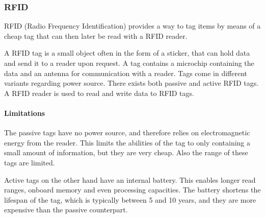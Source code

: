 \subsubsection{RFID}
RFID (Radio Frequency Identification) provides a way to tag items by means of a cheap tag that can then later be read with a RFID reader.

A RFID tag is a small object often in the form of a sticker, that can hold data and send it to a reader upon request.
A tag contains a microchip containing the data and an antenna for communication with a reader.
Tags come in different variants regarding power source.
There exists both passive and active RFID tags.\cite{rfidreview}
A RFID reader is used to read and write data to RFID tags.

\paragraph{Limitations}
The passive tags have no power source, and therefore relies on electromagnetic energy from the reader.
This limits the abilities of the tag to only containing a small amount of information, but they are very cheap.
Also the range of these tags are limited. \cite{rfidreview}

Active tags on the other hand have an internal battery.
This enables longer read ranges, onboard memory and even processing capacities.
The battery shortens the lifespan of the tag, which is typically between 5 and 10 years, and they are more expensive than the passive counterpart. \cite{rfidreview}